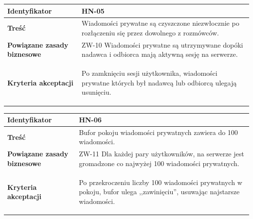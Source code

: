 \vspace{1em}

\begin{tabular}{ | l | l | }
	\hline
		\textbf{Identyfikator} &
		HN-05
		\\

	\hline
		\textbf{Treść} & \parbox[t]{11.5cm}{\strut
			Wiadomości prywatne są czyszczone niezwłocznie po rozłączeniu się przez dowolnego z rozmówców.
		\strut}\\

	\hline
		\parbox[t]{4cm}{\textbf{Powiązane zasady biznesowe}} & \parbox[t]{11.5cm}{\strut
			ZW-10 Wiadomości prywatne są utrzymywane dopóki nadawca i odbiorca mają aktywną sesję na serwerze.
		\strut}\\

	\hline
		\parbox[t]{4cm}{\textbf{Kryteria akceptacji}} & \parbox[t]{11.5cm}{\strut
			\begin{enumreq}
				\item Po zamknięciu sesji użytkownika, wiadomości prywatne których był nadawcą lub odbiorcą ulegają
        usunięciu.
			\end{enumreq}
			\strut}
		\\

	\hline
\end{tabular}

\vspace{1em}

\begin{tabular}{ | l | l | }
	\hline
		\textbf{Identyfikator} &
		HN-06
		\\

	\hline
		\textbf{Treść} & \parbox[t]{11.5cm}{\strut
			Bufor pokoju wiadomości prywatnych zawiera do 100 wiadomości.
		\strut}\\

	\hline
		\parbox[t]{4cm}{\textbf{Powiązane zasady biznesowe}} & \parbox[t]{11.5cm}{\strut
			ZW-11 Dla każdej pary użytkowników, na serwerze jest gromadzone co najwyżej 100 wiadomości prywatnych.
		\strut}\\

	\hline
		\parbox[t]{4cm}{\textbf{Kryteria akceptacji}} & \parbox[t]{11.5cm}{\strut
			\begin{enumreq}
				\item Po przekroczeniu liczby 100 wiadomości prywatnych w pokoju, bufor
        ulega ,,zawinięciu'', usuwając najstarsze wiadomości.
			\end{enumreq}
			\strut}
		\\

	\hline
\end{tabular}

